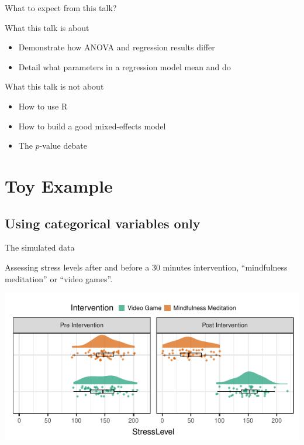 \documentclass{beamer}
\begin{document}
\begin{frame}{What to expect from this talk?}

  \vfill
  \begin{block}{What this talk is about}
    \begin{itemize}
      \item Demonstrate how ANOVA and regression results differ
      \item Detail what parameters in a regression model mean and do
    \end{itemize}
  \end{block}
  \vfill
  \pause
  \begin{block}{What this talk is not about}
    \begin{itemize}
      \item How to use R
      \item How to build a good mixed-effects model
      \item The $p$-value debate
    \end{itemize}
  \end{block}
  \vfill

\end{frame}

\section{Toy Example}

\subsection{Using categorical variables only}

\begin{frame}{The simulated data}
  
  \vfill
  Assessing stress levels after and before a 30 minutes intervention, ``mindfulness meditation'' or ``video games''.
  \vfill
  \pause
  \begin{center}
  \includegraphics{../src/CategoricalRaincloud.pdf}
  \end{center}
  \vfill

\end{frame}
\end{document}

